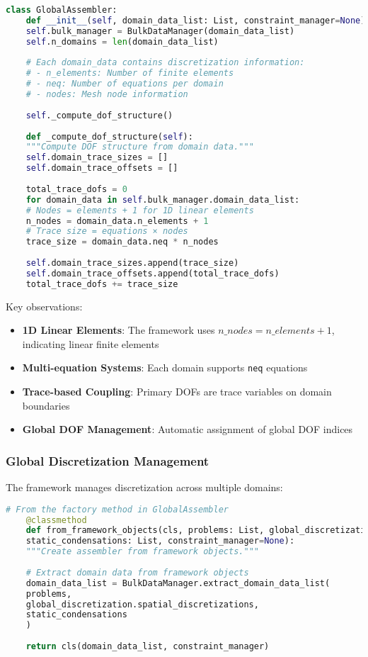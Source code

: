 \begin{lstlisting}[language=Python, caption=Domain Discretization from Global Assembly]
	class GlobalAssembler:
	def __init__(self, domain_data_list: List, constraint_manager=None):
	self.bulk_manager = BulkDataManager(domain_data_list)
	self.n_domains = len(domain_data_list)
	
	# Each domain_data contains discretization information:
	# - n_elements: Number of finite elements
	# - neq: Number of equations per domain
	# - nodes: Mesh node information
	
	self._compute_dof_structure()
	
	def _compute_dof_structure(self):
	"""Compute DOF structure from domain data."""
	self.domain_trace_sizes = []
	self.domain_trace_offsets = []
	
	total_trace_dofs = 0
	for domain_data in self.bulk_manager.domain_data_list:
	# Nodes = elements + 1 for 1D linear elements
	n_nodes = domain_data.n_elements + 1
	# Trace size = equations × nodes
	trace_size = domain_data.neq * n_nodes
	
	self.domain_trace_sizes.append(trace_size)
	self.domain_trace_offsets.append(total_trace_dofs)
	total_trace_dofs += trace_size
\end{lstlisting}

Key observations:
\begin{itemize}
	\item \textbf{1D Linear Elements}: The framework uses $n\_nodes = n\_elements + 1$, indicating linear finite elements
	\item \textbf{Multi-equation Systems}: Each domain supports \texttt{neq} equations
	\item \textbf{Trace-based Coupling}: Primary DOFs are trace variables on domain boundaries
	\item \textbf{Global DOF Management}: Automatic assignment of global DOF indices
\end{itemize}

\subsubsection{Global Discretization Management}

The framework manages discretization across multiple domains:

\begin{lstlisting}[language=Python, caption=Global Discretization Coordination]
	# From the factory method in GlobalAssembler
	@classmethod
	def from_framework_objects(cls, problems: List, global_discretization, 
	static_condensations: List, constraint_manager=None):
	"""Create assembler from framework objects."""
	
	# Extract domain data from framework objects
	domain_data_list = BulkDataManager.extract_domain_data_list(
	problems, 
	global_discretization.spatial_discretizations, 
	static_condensations
	)
	
	return cls(domain_data_list, constraint_manager)
\end{lstlisting}

